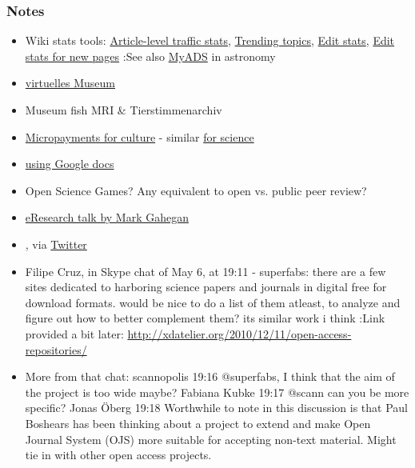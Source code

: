 \documentclass[final,authoryear,3p]{elsarticle-open-drafting}
\begin{document}
\subsubsection{Notes}
\begin{itemize}
	\item Wiki stats tools: \href{http://stats.grok.se/en/201101/Magnetic resonance imaging}{Article-level traffic stats}, \href{http://www.trendingtopics.org/page/Magnetic_resonance_imaging}{Trending topics}, \href{http://www.wikirage.com/}{Edit stats}, \href{http://unit1.conus.info:8080/en.wikipedia.stats/}{Edit stats for new pages}
:See also \href{http://adsabs.harvard.edu/myADS/cache/278851069_PRE.html}{MyADS} in astronomy
	\item \href{http://de.guttenplag.wikia.com/wiki/Benutzer_Blog:Mr._Nice/Quo_vadis,_GuttenPlag}{virtuelles Museum}
	\item Museum fish MRI \& Tierstimmenarchiv
	\item \href{http://ff.im/CCtKf}{Micropayments for culture}  - similar \href{http://friendfeed.com/open-science-summit-2010/a3a7a6ca/sciflies-microfinancing-for-science}{for science}
	\item \href{http://chronicle.com/blogs/profhacker/using-google-docs-forms-to-run-a-peer-review-writing-workshop/33107}{using Google docs}
	\item Open Science Games? Any equivalent to open vs. public peer review?
	\item \href{http://friendfeed.com/kubke/ae9078a8/rt-bestgrid-6pm-tonight-streaming-live}{eResearch talk by Mark Gahegan}
	\item \href{http://museumgam.es/ Museum metadata games}, via \href{http://twitter.com/mia_out}{Twitter}
	\item Filipe Cruz, in Skype chat of May 6, at 19:11 - superfabs: there are a few sites dedicated to harboring science papers and journals in digital free for download formats. would be nice to do a list of them atleast, to analyze and figure out how to better complement them? its similar work i think
:Link provided a bit later: \href{http://xdatelier.org/2010/12/11/open-access-repositories/}{http://xdatelier.org/2010/12/11/open-access-repositories/}
	\item More from that chat: 
scannopolis 19:16 
@superfabs, I think that the aim of the project is too wide maybe?
Fabiana Kubke 19:17 
@scann can you be more specific?
Jonas {\"O}berg 19:18 
Worthwhile to note in this discussion is that Paul Boshears has been thinking about a project to extend and make Open Journal System (OJS) more suitable for accepting non-text material. Might tie in with other open access projects.

\end{itemize}
\end{document}
